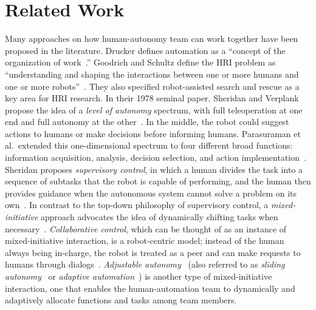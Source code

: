 \section{Related Work}
\label{sec:RelatedWork6}

Many approaches on how human-autonomy team can work together have been proposed in the literature. Drucker defines automation as a ``concept of the organization of work~\cite{Drucker2006Practice}.'' Goodrich and Schultz define the HRI problem as ``understanding and shaping the interactions between one or more humans and one or more robots''~\cite{Goodrich2007HRISurvey}. They also specified robot-assisted search and rescue as a key area for HRI research. In their 1978 seminal paper, Sheridan and Verplank propose the idea of a \textit{level of autonomy} spectrum, with full teleoperation at one end and full autonomy at the other~\cite{Sheridan1978Human}. In the middle, the robot could suggest actions to humans or make decisions before informing humans. Parasuraman et al.\ extended this one-dimensional spectrum to four different broad functions: information acquisition, analysis, decision selection, and action implementation~\cite{Parasuraman2000Model}. Sheridan proposes \textit{supervisory control}, in which a human divides the task into a sequence of subtasks that the robot is capable of performing, and the human then provides guidance when the autonomous system cannot solve a problem on its own~\cite{Sheridan1992Telerobotics}. In contrast to the top-down philosophy of supervisory control, a \textit{mixed-initiative} approach advocates the idea of dynamically shifting tasks when necessary~\cite{Hearst1999Mixed}. \textit{Collaborative control}, which can be thought of as an instance of mixed-initiative interaction, is a robot-centric model; instead of the human always being in-charge, the robot is treated as a peer and can make requests to humans through dialogs~\cite{Fong1999Collaborative}. \textit{Adjustable autonomy}~\cite{Dorais2001Designing} (also referred to as \textit{sliding autonomy}~\cite{Dias2008SlidingAutonomy} or \textit{adaptive automation}~\cite{Rouse1988Adaptive}) is another type of mixed-initiative interaction, one that enables the human-automation team to dynamically and adaptively allocate functions and tasks among team members. 

